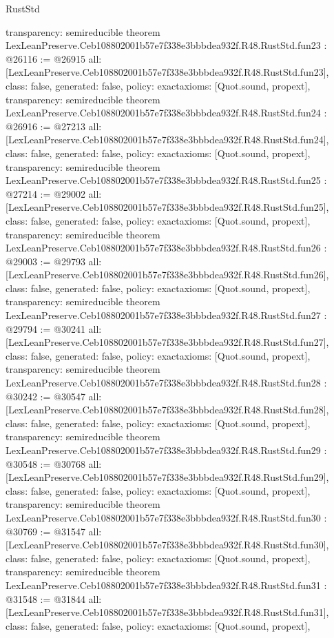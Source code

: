 \begin{lexlean}{RustStd}
\begin{coremodule}
{  transparency: semireducible
}
theorem LexLeanPreserve.Ceb108802001b57e7f338e3bbbdea932f.R48.RustStd.fun23 : @26116 := @26915 {
  all: [LexLeanPreserve.Ceb108802001b57e7f338e3bbbdea932f.R48.RustStd.fun23],
  class: false,
  generated: false,
  policy: exact{axioms: [Quot.sound, propext]},
  transparency: semireducible
}
theorem LexLeanPreserve.Ceb108802001b57e7f338e3bbbdea932f.R48.RustStd.fun24 : @26916 := @27213 {
  all: [LexLeanPreserve.Ceb108802001b57e7f338e3bbbdea932f.R48.RustStd.fun24],
  class: false,
  generated: false,
  policy: exact{axioms: [Quot.sound, propext]},
  transparency: semireducible
}
theorem LexLeanPreserve.Ceb108802001b57e7f338e3bbbdea932f.R48.RustStd.fun25 : @27214 := @29002 {
  all: [LexLeanPreserve.Ceb108802001b57e7f338e3bbbdea932f.R48.RustStd.fun25],
  class: false,
  generated: false,
  policy: exact{axioms: [Quot.sound, propext]},
  transparency: semireducible
}
theorem LexLeanPreserve.Ceb108802001b57e7f338e3bbbdea932f.R48.RustStd.fun26 : @29003 := @29793 {
  all: [LexLeanPreserve.Ceb108802001b57e7f338e3bbbdea932f.R48.RustStd.fun26],
  class: false,
  generated: false,
  policy: exact{axioms: [Quot.sound, propext]},
  transparency: semireducible
}
theorem LexLeanPreserve.Ceb108802001b57e7f338e3bbbdea932f.R48.RustStd.fun27 : @29794 := @30241 {
  all: [LexLeanPreserve.Ceb108802001b57e7f338e3bbbdea932f.R48.RustStd.fun27],
  class: false,
  generated: false,
  policy: exact{axioms: [Quot.sound, propext]},
  transparency: semireducible
}
theorem LexLeanPreserve.Ceb108802001b57e7f338e3bbbdea932f.R48.RustStd.fun28 : @30242 := @30547 {
  all: [LexLeanPreserve.Ceb108802001b57e7f338e3bbbdea932f.R48.RustStd.fun28],
  class: false,
  generated: false,
  policy: exact{axioms: [Quot.sound, propext]},
  transparency: semireducible
}
theorem LexLeanPreserve.Ceb108802001b57e7f338e3bbbdea932f.R48.RustStd.fun29 : @30548 := @30768 {
  all: [LexLeanPreserve.Ceb108802001b57e7f338e3bbbdea932f.R48.RustStd.fun29],
  class: false,
  generated: false,
  policy: exact{axioms: [Quot.sound, propext]},
  transparency: semireducible
}
theorem LexLeanPreserve.Ceb108802001b57e7f338e3bbbdea932f.R48.RustStd.fun30 : @30769 := @31547 {
  all: [LexLeanPreserve.Ceb108802001b57e7f338e3bbbdea932f.R48.RustStd.fun30],
  class: false,
  generated: false,
  policy: exact{axioms: [Quot.sound, propext]},
  transparency: semireducible
}
theorem LexLeanPreserve.Ceb108802001b57e7f338e3bbbdea932f.R48.RustStd.fun31 : @31548 := @31844 {
  all: [LexLeanPreserve.Ceb108802001b57e7f338e3bbbdea932f.R48.RustStd.fun31],
  class: false,
  generated: false,
  policy: exact{axioms: [Quot.sound, propext]},
}
\end{coremodule}
\end{lexlean}
